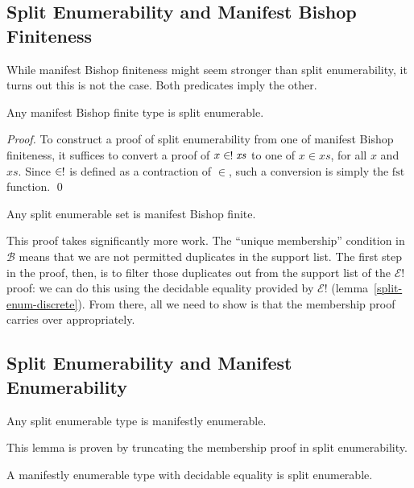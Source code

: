 \subsection{Split Enumerability and Manifest Bishop Finiteness}
While manifest Bishop finiteness might seem stronger than split enumerability,
it turns out this is not the case.
Both predicates imply the other.
\begin{lemma} \label{manifest-bishop-to-split-enum}
  Any manifest Bishop finite type is split enumerable.
\end{lemma}
\begin{proof}
  To construct a proof of split enumerability from one of manifest Bishop
  finiteness, it suffices to convert a proof of \(x \inunique \mathit{xs}\) to
  one of \(x \in \mathit{xs}\), for all \(x\) and \(\mathit{xs}\).
  Since \(\inunique\) is defined as a contraction of \(\in\), such a conversion
  is simply the \(\text{fst}\) function.
  \qed
\end{proof}

\begin{lemma} \label{split-enum-to-manifest-bishop}
  Any split enumerable set is manifest Bishop finite.
\end{lemma}
This proof takes significantly more work.
The ``unique membership'' condition in \(\mathcal{B}\) means that we are not
permitted duplicates in the support list.
The first step in the proof, then, is to filter those duplicates out from the
support list of the \(\mathcal{E}!\) proof: we can do this using the decidable
equality provided by \(\mathcal{E}!\) (lemma~\ref{split-enum-discrete}).
From there, all we need to show is that the membership proof carries over
appropriately.
\subsection{Split Enumerability and Manifest Enumerability}
\begin{lemma} \label{split-enum-to-manifest-enum}
  Any split enumerable type is manifestly enumerable.
\end{lemma}
This lemma is proven by truncating the membership proof in split enumerability.

\begin{lemma} \label{manifest-enum-to-split-enum}
  A manifestly enumerable type with decidable equality is split enumerable.
\end{lemma}

